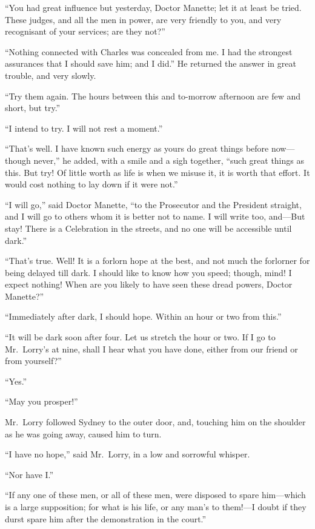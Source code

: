 ``You had great influence but yesterday, Doctor Manette; let it at
least be tried.  These judges, and all the men in power, are very
friendly to you, and very recognisant of your services; are they not?''

``Nothing connected with Charles was concealed from me.  I had the
strongest assurances that I should save him; and I did.''  He returned
the answer in great trouble, and very slowly.

``Try them again.  The hours between this and to-morrow afternoon are
few and short, but try.''

``I intend to try.  I will not rest a moment.''

``That's well.  I have known such energy as yours do great things
before now---though never,'' he added, with a smile and a sigh together,
``such great things as this.  But try!  Of little worth as life is when
we misuse it, it is worth that effort.  It would cost nothing to lay
down if it were not.''

``I will go,'' said Doctor Manette, ``to the Prosecutor and the President
straight, and I will go to others whom it is better not to name.
I will write too, and---But stay!  There is a Celebration in the streets,
and no one will be accessible until dark.''

``That's true.  Well!  It is a forlorn hope at the best, and not much
the forlorner for being delayed till dark.  I should like to know how
you speed; though, mind!  I expect nothing!  When are you likely to
have seen these dread powers, Doctor Manette?''

``Immediately after dark, I should hope.  Within an hour or two from this.''

``It will be dark soon after four.  Let us stretch the hour or two.
If I go to Mr.\ Lorry's at nine, shall I hear what you have done,
either from our friend or from yourself?''

``Yes.''

``May you prosper!''

Mr.\ Lorry followed Sydney to the outer door, and, touching him on the
shoulder as he was going away, caused him to turn.

``I have no hope,'' said Mr.\ Lorry, in a low and sorrowful whisper.

``Nor have I.''

``If any one of these men, or all of these men, were disposed to spare
him---which is a large supposition; for what is his life, or any man's
to them!---I doubt if they durst spare him after the demonstration in
the court.''

